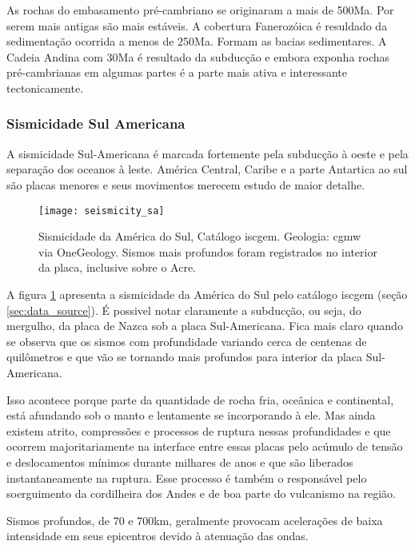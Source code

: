 As rochas do embasamento pré-cambriano se originaram a mais de 500Ma. Por serem mais antigas
são mais estáveis. A cobertura Fanerozóica é resuldado da sedimentação ocorrida a menos de 250Ma. Formam as bacias
sedimentares. A Cadeia Andina com 30Ma é resultado da subducção e embora exponha rochas pré-cambrianas
em algumas partes é a parte mais ativa e interessante tectonicamente.


\subsubsection{Sismicidade Sul Americana}

A sismicidade Sul-Americana é marcada fortemente pela subducção à oeste e pela 
separação dos oceanos à leste. América Central, Caribe e a parte Antartica ao sul
são placas menores e seus movimentos merecem estudo de maior detalhe.

\begin{figure}[H]
  \centering
  \texttt{[image: seismicity\_sa]} 
  \caption{Sismicidade da América do Sul, Catálogo \gls*{iscgem}. 
  		   Geologia: \gls*{cgmw} via OneGeology.
		   Sismos mais profundos foram registrados no interior da placa, inclusive sobre o Acre.
  		   }
  \label{fig:sa_seis} 
\end{figure}

A figura \ref{fig:sa_seis} apresenta a sismicidade da América do Sul pelo catálogo \gls{iscgem}
(seção \ref{sec:data_source}). É possivel notar claramente a subducção, ou seja, do mergulho, da placa de Nazca sob a placa
Sul-Americana. Fica mais claro quando se observa que os sismos com profundidade variando cerca de centenas de
quilômetros e que vão se tornando mais profundos para interior da placa Sul-Americana.

Isso acontece porque parte da quantidade de rocha fria, oceânica e continental, está afundando sob o manto
e lentamente se incorporando à ele. Mas ainda existem atrito, compressões e processos de ruptura nessas
profundidades e que ocorrem majoritariamente na interface entre essas placas pelo acúmulo de tensão e deslocamentos 
mínimos durante milhares de anos e que são liberados instantaneamente na ruptura. 
Esse processo é também o responsável pelo soerguimento da 
cordilheira dos Andes e de boa parte do vulcanismo na região. 

Sismos profundos, de 70 e 700km, geralmente provocam acelerações de baixa intensidade em seus epicentros 
devido à atenuação das ondas.

